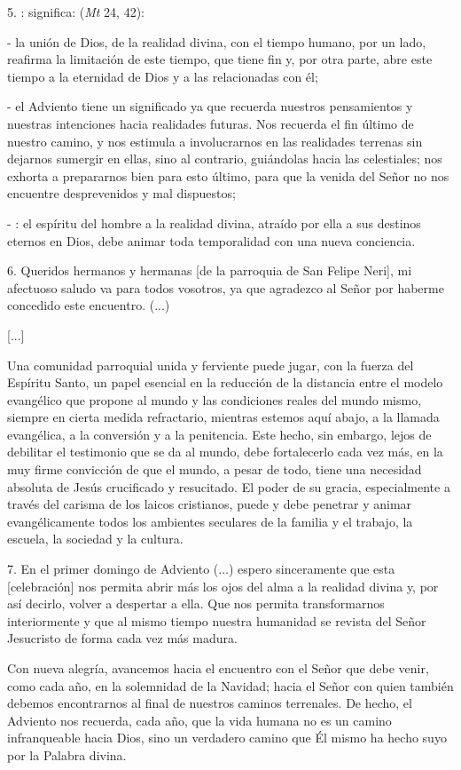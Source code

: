 \begin{body}
	5. : significa:  (\emph{Mt} 24, 42):
	
	- la unión de Dios, de la realidad divina, con el tiempo humano, por un lado, reafirma la limitación de este tiempo, que tiene fin y, por otra parte, abre este tiempo a la eternidad de Dios y a las  relacionadas con él;
	
	- el Adviento tiene un significado  ya que recuerda nuestros pensamientos y nuestras intenciones hacia realidades futuras. Nos recuerda el fin último de nuestro camino, y nos estimula a involucrarnos en las realidades terrenas sin dejarnos sumergir en ellas, sino al contrario, guiándolas hacia las celestiales; nos exhorta a prepararnos bien para esto último, para que la venida del Señor no nos encuentre desprevenidos y mal dispuestos;
	
	- : el espíritu del hombre  a la realidad divina, atraído por ella a sus destinos eternos en Dios, debe animar toda temporalidad con una nueva conciencia.
	
	6. Queridos hermanos y hermanas {[}de la parroquia de San Felipe Neri{]}, mi afectuoso saludo va para todos vosotros, ya que agradezco al Señor por haberme concedido este encuentro. (...)
	
	{[}...{]}
	
	Una comunidad parroquial unida y ferviente puede jugar, con la fuerza del Espíritu Santo, un papel esencial en la reducción de la distancia entre el modelo evangélico que propone al mundo y las condiciones reales del mundo mismo, siempre en cierta medida refractario, mientras estemos aquí abajo, a la llamada evangélica, a la conversión y a la penitencia. Este hecho, sin embargo, lejos de debilitar el testimonio que se da al mundo, debe fortalecerlo cada vez más, en la muy firme convicción de que el mundo, a pesar de todo, tiene una necesidad absoluta de Jesús crucificado y resucitado. El poder de su gracia, especialmente a través del carisma de los laicos cristianos, puede y debe penetrar y animar evangélicamente todos los ambientes seculares de la familia y el trabajo, la escuela, la sociedad y la cultura.
	
	7. En el primer domingo de Adviento (...) espero sinceramente que esta {[}celebración{]} nos permita abrir más los ojos del alma a la realidad divina y, por así decirlo, volver a despertar a ella. Que nos permita transformarnos interiormente y que al mismo tiempo nuestra humanidad se revista del Señor Jesucristo de forma cada vez más madura.
	
	Con nueva alegría, avancemos hacia el encuentro con el Señor que debe venir, como cada año, en la solemnidad de la Navidad; hacia el Señor con quien también debemos encontrarnos al final de nuestros caminos terrenales. De hecho, el Adviento nos recuerda, cada año, que la vida humana no es un camino infranqueable hacia Dios, sino un verdadero camino que Él mismo ha hecho suyo por la Palabra divina.
\end{body}

